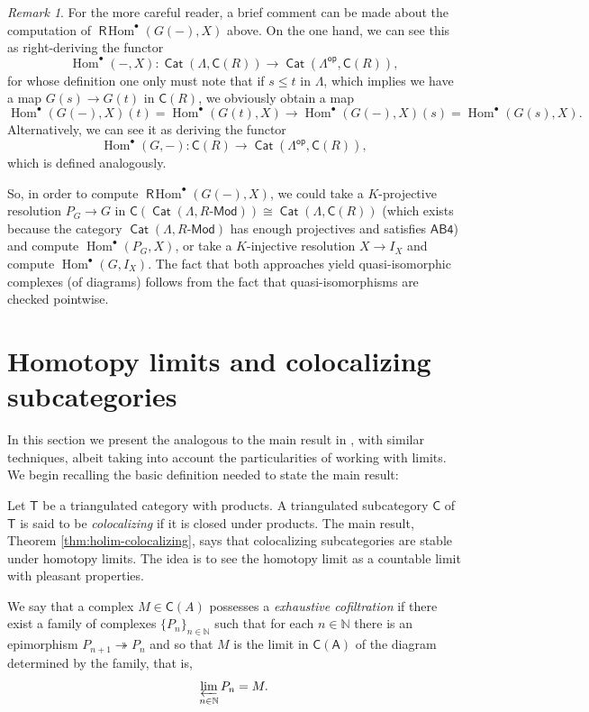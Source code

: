 \documentclass[reqno,11pt]{amsart}
\theoremstyle{plain}
\theoremstyle{remark}
\newtheorem*{rem}{Remark}
\theoremstyle{definition}
\numberwithin{equation}{thm}
\newcommand{\SA}{\mathsf{A}}
\newcommand{\SC}{\mathsf{C}}
\newcommand{\ST}{\boldsymbol{\mathsf{T}}}
\newcommand{\CCC}{\boldsymbol{\mathsf{C}}}
\newcommand{\R}{\boldsymbol{\mathsf{R}}}
\newcommand{\NN}{\mathbb{N}}
\newcommand{\epi}{\twoheadrightarrow}
\DeclareMathOperator{\Hom}{Hom}
\DeclareMathOperator{\rhom}{\R\!\Hom}
\newcommand{\md}{\text{-}\mathsf{Mod}}
\newcommand{\op}{\mathsf{op}}
\DeclareMathOperator{\cat}{\mathsf{Cat}}
\begin{document}
	\begin{rem}
		For the more careful reader, a brief comment can be made about the computation of $\rhom^\bullet(G(-),X)$ above. On the one hand, we can see this as right-deriving the functor
		\[
		\Hom^\bullet(-,X) \colon \cat(\Lambda,\CCC(R)) \to \cat(\Lambda^\op, \CCC(R)),
		\] 
		for whose definition one only must note that if $s \leq t$ in $\Lambda$, which implies we have a map $G(s) \to G(t)$ in $\CCC(R)$, we obviously obtain a map
		\[
		\Hom^\bullet(G(-),X)(t) = \Hom^\bullet(G(t),X) \to \Hom^\bullet(G(-),X)(s) = \Hom^\bullet(G(s),X).
		\]
		Alternatively, we can see it as deriving the functor
		\[
		\Hom^\bullet(G,-) \colon \CCC(R) \to \cat(\Lambda^\op, \CCC(R)),
		\]
		which is defined analogously. 
		
		So, in order to compute $\rhom^\bullet(G(-),X)$, we could take a $K$-projective resolution $P_G \to G$ in $\CCC(\cat(\Lambda, R\md)) \cong \cat(\Lambda, \CCC(R))$ (which exists because the category $\cat(\Lambda, R\md)$ has enough projectives and satisfies $\mathsf{AB4}$) and compute $\Hom^\bullet(P_G,X)$, or take a $K$-injective resolution $X \to I_X$ and compute $\Hom^\bullet(G,I_X)$. The fact that both approaches yield quasi-isomorphic complexes (of diagrams) follows from the fact that quasi-isomorphisms are checked pointwise.
	\end{rem}


\section{Homotopy limits and colocalizing subcategories}\label{Section:homotopy-limits-and-colocalizing-subcategories}
	In this section we present the analogous to the main result in \cite[\S 3]{AJS}, with similar techniques, albeit taking into account the particularities of working with limits. We begin recalling the basic definition needed to state the main result:
	
	Let $\ST$ be a triangulated category with products. A triangulated subcategory $\SC$ of $\ST$ is said to be \textit{colocalizing} if it is closed under products. The main result, Theorem \ref{thm:holim-colocalizing}, says that colocalizing subcategories are stable under homotopy limits. The idea is to see the homotopy limit as a countable limit with pleasant properties. 

	We say that a complex $M \in \CCC(A)$ possesses a \textit{exhaustive cofiltration} if there exist a family of complexes $\{P_n\}_{n \in \NN}$ such that for each $n \in \NN$ there is an epimorphism $P_{n+1} \epi P_n$ and so that $M$ is the limit in $\CCC(\SA)$ of the diagram determined by the family, that is,
	\[
		\varprojlim_{n \in \NN} P_n = M.
	\]
\end{document}
